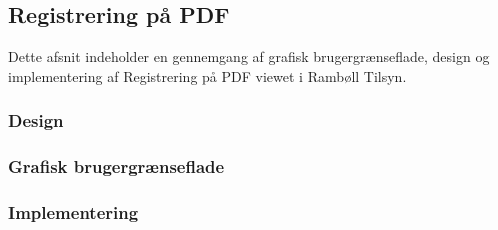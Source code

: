 \subsection{Registrering på PDF}
Dette afsnit indeholder en gennemgang af grafisk brugergrænseflade, design og implementering af Registrering på PDF viewet i Rambøll Tilsyn.

\subsubsection{Design}

\subsubsection{Grafisk brugergrænseflade}

\subsubsection{Implementering}